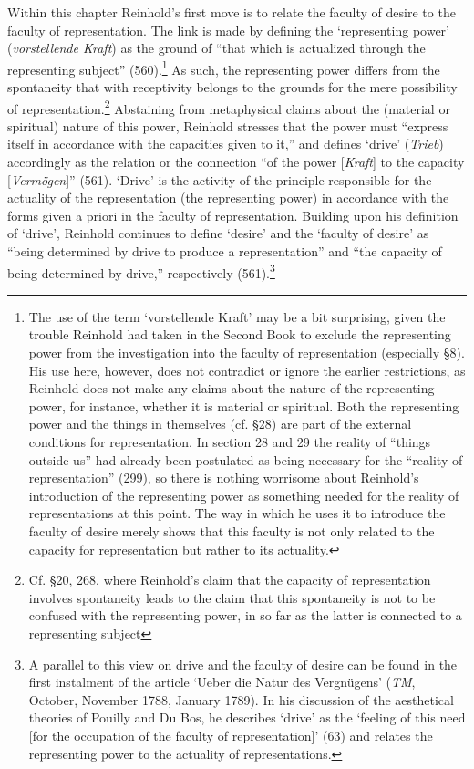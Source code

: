  Within this chapter Reinhold's first move is to relate the faculty of desire to the faculty of representation. The link is made by defining the `representing power' (\textit{vorstellende Kraft}) as the ground of ``that which is actualized through the representing subject'' (560).\footnote{ The use of the term `vorstellende Kraft' may be a bit surprising, given the trouble Reinhold had taken in the Second Book to exclude the representing power from the investigation into the faculty of representation (especially \S  8). His use here, however, does not contradict or ignore the earlier restrictions, as Reinhold does not make any claims about the nature of the representing power, for instance, whether it is material or spiritual. Both the representing power and the things in themselves (cf. \S  28) are part of the external conditions for representation. In section 28 and 29 the reality of ``things outside us'' had already been postulated as being necessary for the ``reality of representation'' (299), so there is nothing worrisome about Reinhold's introduction of the representing power as something needed for the reality of representations at this point. The way in which he uses it to introduce the faculty of desire merely shows that this faculty is not only related to the capacity for representation but rather to its actuality. } As such, the representing power differs from the spontaneity that with receptivity belongs to the grounds for the mere possibility of representation.\footnote{ Cf. \S  20, 268, where Reinhold's claim that the capacity of representation involves spontaneity leads to the claim that this spontaneity is not to be confused with the representing power, in so far as the latter is connected to a representing subject} Abstaining from metaphysical claims about the (material or spiritual) nature of this power, Reinhold stresses that the power must ``express itself in accordance with the capacities given to it,'' and defines `drive' (\textit{Trieb}) accordingly as the relation or the connection ``of the power [\textit{Kraft}] to the capacity [\textit{Verm\"{o}gen}]'' (561). `Drive' is the activity of the principle responsible for the actuality of the representation (the representing power) in accordance with the forms given a priori in the faculty of representation. Building upon his definition of `drive', Reinhold continues to define `desire' and the `faculty of desire' as ``being determined by drive to produce a representation'' and ``the capacity of being determined by drive,'' respectively (561).\footnote{ A parallel to this view on drive and the faculty of desire can be found in the first instalment of the article `Ueber die Natur des Vergn\"{u}gens' (\textit{TM}, October, November 1788, January 1789). In his discussion of the aesthetical theories of Pouilly and Du Bos, he describes `drive' as the `feeling of this need [for the occupation of the faculty of representation]' (63) and relates the representing power to the actuality of representations. } 

